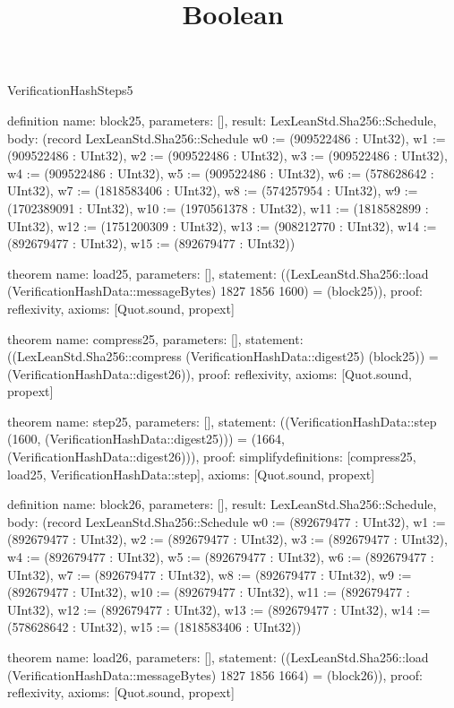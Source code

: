 \begin{lexlean}{VerificationHashSteps5}
\title{Boolean}
\begin{semanticmodule}

definition{
  name: block25,
  parameters: [],
  result: LexLeanStd.Sha256::Schedule,
  body: (record LexLeanStd.Sha256::Schedule {w0 := (909522486 : UInt32), w1 := (909522486 : UInt32), w2 := (909522486 : UInt32), w3 := (909522486 : UInt32), w4 := (909522486 : UInt32), w5 := (909522486 : UInt32), w6 := (578628642 : UInt32), w7 := (1818583406 : UInt32), w8 := (574257954 : UInt32), w9 := (1702389091 : UInt32), w10 := (1970561378 : UInt32), w11 := (1818582899 : UInt32), w12 := (1751200309 : UInt32), w13 := (908212770 : UInt32), w14 := (892679477 : UInt32), w15 := (892679477 : UInt32)})
}

theorem{
  name: load25,
  parameters: [],
  statement: ((LexLeanStd.Sha256::load (VerificationHashData::messageBytes) 1827 1856 1600) = (block25)),
  proof: reflexivity{},
  axioms: [Quot.sound, propext]
}

theorem{
  name: compress25,
  parameters: [],
  statement: ((LexLeanStd.Sha256::compress (VerificationHashData::digest25) (block25)) = (VerificationHashData::digest26)),
  proof: reflexivity{},
  axioms: [Quot.sound, propext]
}

theorem{
  name: step25,
  parameters: [],
  statement: ((VerificationHashData::step (1600, (VerificationHashData::digest25))) = (1664, (VerificationHashData::digest26))),
  proof: simplify{definitions: [compress25, load25, VerificationHashData::step]},
  axioms: [Quot.sound, propext]
}

definition{
  name: block26,
  parameters: [],
  result: LexLeanStd.Sha256::Schedule,
  body: (record LexLeanStd.Sha256::Schedule {w0 := (892679477 : UInt32), w1 := (892679477 : UInt32), w2 := (892679477 : UInt32), w3 := (892679477 : UInt32), w4 := (892679477 : UInt32), w5 := (892679477 : UInt32), w6 := (892679477 : UInt32), w7 := (892679477 : UInt32), w8 := (892679477 : UInt32), w9 := (892679477 : UInt32), w10 := (892679477 : UInt32), w11 := (892679477 : UInt32), w12 := (892679477 : UInt32), w13 := (892679477 : UInt32), w14 := (578628642 : UInt32), w15 := (1818583406 : UInt32)})
}

theorem{
  name: load26,
  parameters: [],
  statement: ((LexLeanStd.Sha256::load (VerificationHashData::messageBytes) 1827 1856 1664) = (block26)),
  proof: reflexivity{},
  axioms: [Quot.sound, propext]
}


\end{semanticmodule}
\end{lexlean}
